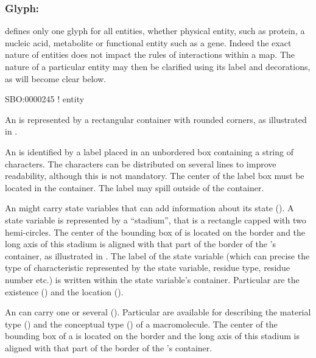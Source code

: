 
\subsubsection{Glyph: }
\label{sec:entity}

\SBGNERLone defines only one glyph for all entities, whether physical entity, such as protein, a nucleic acid, metabolite or functional entity such as a gene. Indeed the exact nature of entities does not impact the rules of interactions within a map. The nature of a particular entity may then be clarified using its label and decorations, as will become clear below. 

\begin{glyphDescription}

\glyphSboTerm SBO:0000245 ! entity 

\glyphContainer An  is represented by a rectangular container with rounded corners, as illustrated in .

\glyphLabel An  is identified by a label placed in an unbordered box containing a string of characters.  The characters can be distributed on several lines to improve readability, although this is not mandatory.  The center of the label box must be located in the container. The label may spill outside of the container. 

\glyphAux An  might carry state variables that can add information about its state ().  A state variable is represented by a ``stadium'', that is a rectangle capped with two hemi-circles. The center of the bounding box of  is located on the border and the long axis of this stadium is aligned with that part of the border of the 's container, as illustrated in .  The label of the state variable (which can precise the type of characteristic represented by the state variable, residue type, residue number etc.) is written within the state variable's container. Particular  are the existence () and the location ().

An  can carry one or several  ().  Particular  are available for describing the material type () and the conceptual type () of a macromolecule.  The center of the bounding box of a  is located on the border and the long axis of this stadium is aligned with that part of the border of the 's container.

\end{glyphDescription}

